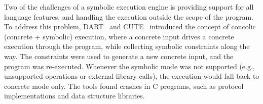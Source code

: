 




Two of the challenges of a symbolic execution engine is providing support for all language features, and handling the execution outside the scope of the program.  To address this problem, DART~\cite{dart} and CUTE~\cite{cute} introduced the concept of concolic (concrete + symbolic) execution, where a concrete input drives a concrete execution through the program, while collecting symbolic constraints along the way.  The constraints were used to generate a new concrete input, and the program was re-executed.  Whenever the symbolic mode was not supported (e.g., unsupported operations or external library calls), the execution would fall back to concrete mode only.  The tools found crashes in C programs, such as protocol implementations and data structure libraries.









